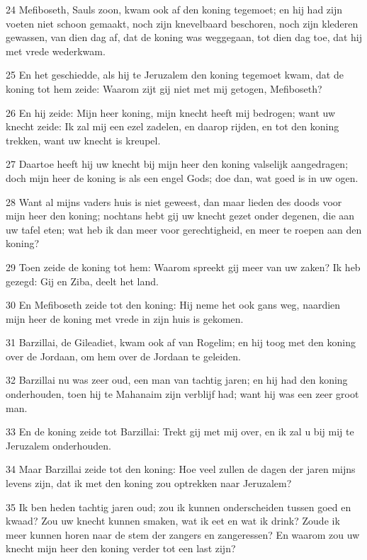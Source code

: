 \par 24 Mefiboseth, Sauls zoon, kwam ook af den koning tegemoet; en hij had zijn voeten niet schoon gemaakt, noch zijn knevelbaard beschoren, noch zijn klederen gewassen, van dien dag af, dat de koning was weggegaan, tot dien dag toe, dat hij met vrede wederkwam.
\par 25 En het geschiedde, als hij te Jeruzalem den koning tegemoet kwam, dat de koning tot hem zeide: Waarom zijt gij niet met mij getogen, Mefiboseth?
\par 26 En hij zeide: Mijn heer koning, mijn knecht heeft mij bedrogen; want uw knecht zeide: Ik zal mij een ezel zadelen, en daarop rijden, en tot den koning trekken, want uw knecht is kreupel.
\par 27 Daartoe heeft hij uw knecht bij mijn heer den koning valselijk aangedragen; doch mijn heer de koning is als een engel Gods; doe dan, wat goed is in uw ogen.
\par 28 Want al mijns vaders huis is niet geweest, dan maar lieden des doods voor mijn heer den koning; nochtans hebt gij uw knecht gezet onder degenen, die aan uw tafel eten; wat heb ik dan meer voor gerechtigheid, en meer te roepen aan den koning?
\par 29 Toen zeide de koning tot hem: Waarom spreekt gij meer van uw zaken? Ik heb gezegd: Gij en Ziba, deelt het land.
\par 30 En Mefiboseth zeide tot den koning: Hij neme het ook gans weg, naardien mijn heer de koning met vrede in zijn huis is gekomen.
\par 31 Barzillai, de Gileadiet, kwam ook af van Rogelim; en hij toog met den koning over de Jordaan, om hem over de Jordaan te geleiden.
\par 32 Barzillai nu was zeer oud, een man van tachtig jaren; en hij had den koning onderhouden, toen hij te Mahanaim zijn verblijf had; want hij was een zeer groot man.
\par 33 En de koning zeide tot Barzillai: Trekt gij met mij over, en ik zal u bij mij te Jeruzalem onderhouden.
\par 34 Maar Barzillai zeide tot den koning: Hoe veel zullen de dagen der jaren mijns levens zijn, dat ik met den koning zou optrekken naar Jeruzalem?
\par 35 Ik ben heden tachtig jaren oud; zou ik kunnen onderscheiden tussen goed en kwaad? Zou uw knecht kunnen smaken, wat ik eet en wat ik drink? Zoude ik meer kunnen horen naar de stem der zangers en zangeressen? En waarom zou uw knecht mijn heer den koning verder tot een last zijn?

